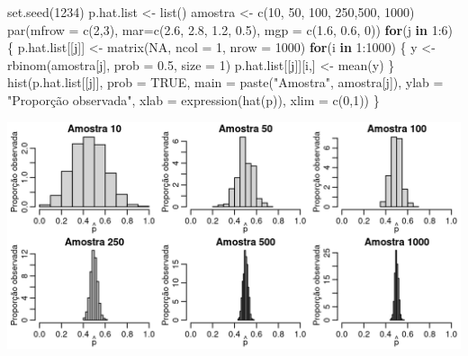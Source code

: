 \documentclass[
  10pt,
  a4paper]{book}
\newenvironment{Shaded}{\begin{snugshade}}{\end{snugshade}}
\newcommand{\AttributeTok}[1]{\textcolor[rgb]{0.77,0.63,0.00}{#1}}
\newcommand{\ConstantTok}[1]{\textcolor[rgb]{0.00,0.00,0.00}{#1}}
\newcommand{\ControlFlowTok}[1]{\textcolor[rgb]{0.13,0.29,0.53}{\textbf{#1}}}
\newcommand{\DecValTok}[1]{\textcolor[rgb]{0.00,0.00,0.81}{#1}}
\newcommand{\FloatTok}[1]{\textcolor[rgb]{0.00,0.00,0.81}{#1}}
\newcommand{\FunctionTok}[1]{\textcolor[rgb]{0.00,0.00,0.00}{#1}}
\newcommand{\NormalTok}[1]{#1}
\newcommand{\OtherTok}[1]{\textcolor[rgb]{0.56,0.35,0.01}{#1}}
\newcommand{\SpecialCharTok}[1]{\textcolor[rgb]{0.00,0.00,0.00}{#1}}
\newcommand{\StringTok}[1]{\textcolor[rgb]{0.31,0.60,0.02}{#1}}
\begin{document}
\begin{Shaded}
\begin{Highlighting}[]
\FunctionTok{set.seed}\NormalTok{(}\DecValTok{1234}\NormalTok{)}
\NormalTok{p.hat.list }\OtherTok{\textless{}{-}} \FunctionTok{list}\NormalTok{()}
\NormalTok{amostra }\OtherTok{\textless{}{-}} \FunctionTok{c}\NormalTok{(}\DecValTok{10}\NormalTok{, }\DecValTok{50}\NormalTok{, }\DecValTok{100}\NormalTok{, }\DecValTok{250}\NormalTok{,}\DecValTok{500}\NormalTok{, }\DecValTok{1000}\NormalTok{)}
\FunctionTok{par}\NormalTok{(}\AttributeTok{mfrow =} \FunctionTok{c}\NormalTok{(}\DecValTok{2}\NormalTok{,}\DecValTok{3}\NormalTok{), }\AttributeTok{mar=}\FunctionTok{c}\NormalTok{(}\FloatTok{2.6}\NormalTok{, }\FloatTok{2.8}\NormalTok{, }\FloatTok{1.2}\NormalTok{, }\FloatTok{0.5}\NormalTok{), }\AttributeTok{mgp =} \FunctionTok{c}\NormalTok{(}\FloatTok{1.6}\NormalTok{, }\FloatTok{0.6}\NormalTok{, }\DecValTok{0}\NormalTok{))}
\ControlFlowTok{for}\NormalTok{(j }\ControlFlowTok{in} \DecValTok{1}\SpecialCharTok{:}\DecValTok{6}\NormalTok{) \{}
\NormalTok{  p.hat.list[[j]] }\OtherTok{\textless{}{-}} \FunctionTok{matrix}\NormalTok{(}\ConstantTok{NA}\NormalTok{, }\AttributeTok{ncol =} \DecValTok{1}\NormalTok{, }\AttributeTok{nrow =} \DecValTok{1000}\NormalTok{)}
  \ControlFlowTok{for}\NormalTok{(i }\ControlFlowTok{in} \DecValTok{1}\SpecialCharTok{:}\DecValTok{1000}\NormalTok{) \{}
\NormalTok{  y }\OtherTok{\textless{}{-}} \FunctionTok{rbinom}\NormalTok{(amostra[j], }\AttributeTok{prob =} \FloatTok{0.5}\NormalTok{, }\AttributeTok{size =} \DecValTok{1}\NormalTok{)}
\NormalTok{  p.hat.list[[j]][i,] }\OtherTok{\textless{}{-}} \FunctionTok{mean}\NormalTok{(y)}
\NormalTok{  \}}
\FunctionTok{hist}\NormalTok{(p.hat.list[[j]], }\AttributeTok{prob =} \ConstantTok{TRUE}\NormalTok{, }\AttributeTok{main =} \FunctionTok{paste}\NormalTok{(}\StringTok{"Amostra"}\NormalTok{, amostra[j]), }
     \AttributeTok{ylab =} \StringTok{"Proporção observada"}\NormalTok{,}
     \AttributeTok{xlab =} \FunctionTok{expression}\NormalTok{(}\FunctionTok{hat}\NormalTok{(p)), }\AttributeTok{xlim =} \FunctionTok{c}\NormalTok{(}\DecValTok{0}\NormalTok{,}\DecValTok{1}\NormalTok{))}
\NormalTok{\}}
\end{Highlighting}
\end{Shaded}

\begin{center}\includegraphics[width=0.99\linewidth]{figures/unnamed-chunk-381-1} \end{center}
\end{document}
